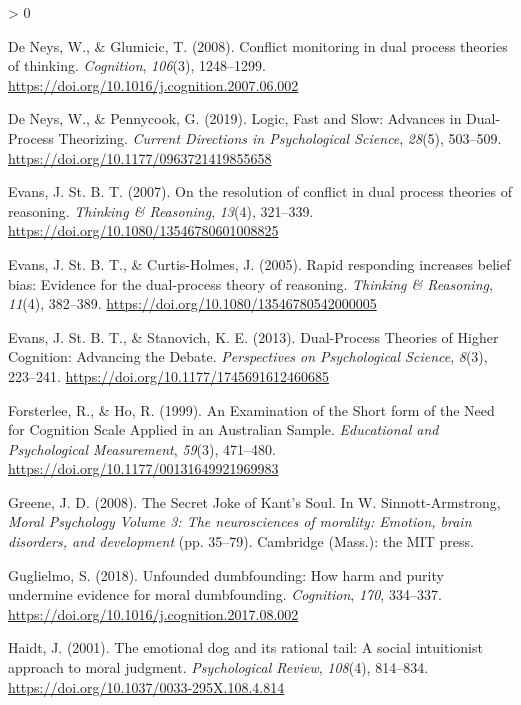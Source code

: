 \documentclass[
  american,
  man,floatsintext]{apa7}
\newlength{\cslhangindent}
\newenvironment{CSLReferences}[2] %
 {%
  \setlength{\parindent}{0pt}
  \ifodd #1 \everypar{\setlength{\hangindent}{\cslhangindent}}\ignorespaces\fi
  \ifnum #2 > 0
  \setlength{\parskip}{#2\baselineskip}
  \fi
 }%
 {}
\begin{document}
\begin{CSLReferences}{1}{0}
\leavevmode\hypertarget{ref-deneys_conflict_2008}{}%
De Neys, W., \& Glumicic, T. (2008). Conflict monitoring in dual process theories of thinking. \emph{Cognition}, \emph{106}(3), 1248--1299. \url{https://doi.org/10.1016/j.cognition.2007.06.002}

\leavevmode\hypertarget{ref-deneys_logic_2019}{}%
De Neys, W., \& Pennycook, G. (2019). Logic, {Fast} and {Slow}: Advances in {Dual}-{Process Theorizing}. \emph{Current Directions in Psychological Science}, \emph{28}(5), 503--509. \url{https://doi.org/10.1177/0963721419855658}

\leavevmode\hypertarget{ref-evans_resolution_2007}{}%
Evans, J. St. B. T. (2007). On the resolution of conflict in dual process theories of reasoning. \emph{Thinking \& Reasoning}, \emph{13}(4), 321--339. \url{https://doi.org/10.1080/13546780601008825}

\leavevmode\hypertarget{ref-evans_rapid_2005}{}%
Evans, J. St. B. T., \& Curtis-Holmes, J. (2005). Rapid responding increases belief bias: Evidence for the dual-process theory of reasoning. \emph{Thinking \& Reasoning}, \emph{11}(4), 382--389. \url{https://doi.org/10.1080/13546780542000005}

\leavevmode\hypertarget{ref-evans_dualprocess_2013}{}%
Evans, J. St. B. T., \& Stanovich, K. E. (2013). Dual-{Process Theories} of {Higher Cognition}: Advancing the {Debate}. \emph{Perspectives on Psychological Science}, \emph{8}(3), 223--241. \url{https://doi.org/10.1177/1745691612460685}

\leavevmode\hypertarget{ref-forsterlee_examination_1999}{}%
Forsterlee, R., \& Ho, R. (1999). An {Examination} of the {Short} form of the {Need} for {Cognition Scale Applied} in an {Australian Sample}. \emph{Educational and Psychological Measurement}, \emph{59}(3), 471--480. \url{https://doi.org/10.1177/00131649921969983}

\leavevmode\hypertarget{ref-greene_secret_2008}{}%
Greene, J. D. (2008). The {Secret Joke} of {Kant}'s {Soul}. In W. Sinnott-Armstrong, \emph{Moral {Psychology Volume} 3: The neurosciences of morality: Emotion, brain disorders, and development} (pp. 35--79). {Cambridge (Mass.)}: {the MIT press}.

\leavevmode\hypertarget{ref-guglielmo_unfounded_2018}{}%
Guglielmo, S. (2018). Unfounded dumbfounding: How harm and purity undermine evidence for moral dumbfounding. \emph{Cognition}, \emph{170}, 334--337. \url{https://doi.org/10.1016/j.cognition.2017.08.002}

\leavevmode\hypertarget{ref-haidt_emotional_2001}{}%
Haidt, J. (2001). The emotional dog and its rational tail: A social intuitionist approach to moral judgment. \emph{Psychological Review}, \emph{108}(4), 814--834. \url{https://doi.org/10.1037/0033-295X.108.4.814}


\end{CSLReferences}
\end{document}
